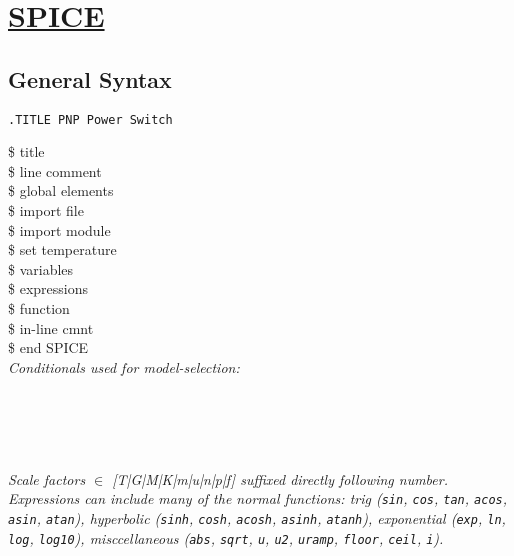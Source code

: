\section{\href{http://ngspice.sourceforge.net/docs/ngspice-manual.pdf}{SPICE}}




\subsection*{General Syntax}
\begin{lstlisting}
.TITLE PNP Power Switch
\end{lstlisting}

 \$ title \\
 \$ line comment \\
 \$ global elements \\
 \$ import file \\
 \$ import module \\
 \$ set temperature \\
 \$ variables \\
 \$ expressions \\
 \$ function \\
 \$ in-line cmnt \\
 \$ end SPICE \\

\textit{Conditionals used for model-selection:}\\
{\scriptsize
{} \\
 \\
 \\
 \\
}

\textit{Scale factors $\in$ [T|G|M|K|m|u|n|p|f] suffixed directly following number.}\\

\textit{Expressions can include many of the normal functions: trig (\texttt{sin}, \texttt{cos}, \texttt{tan}, \texttt{acos}, \texttt{asin}, \texttt{atan}), hyperbolic (\texttt{sinh}, \texttt{cosh}, \texttt{acosh}, \texttt{asinh}, \texttt{atanh}), exponential (\texttt{exp}, \texttt{ln}, \texttt{log}, \texttt{log10}), misccellaneous (\texttt{abs}, \texttt{sqrt}, \texttt{u}, \texttt{u2}, \texttt{uramp}, \texttt{floor}, \texttt{ceil}, \texttt{i}).} \\


